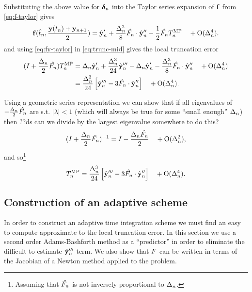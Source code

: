 Substituting the above value for $\mbox{\boldmath$\delta$}_{n}$ into the Taylor series expansion of ${\mathbf{f}}$ from \eqref{eq:f-taylor} gives
\begin{equation}
  {\mathbf{f}}(\hat{t}_{n}, \frac{\mathbf{y}(t_n) + \mathbf{y}_{n+1}}{2}) = \hat{\mathbf{y}}_{n}'
  + \frac{\Delta_{n}^2}{8} \hat{F_{n}} \cdot \hat{\mathbf{y}}_{n}'' - \frac{1}{2} \hat{F_{n}} T_n^{\text{MP}} \quad + \text{O}(\Delta_{n}^4)
  . \label{eq:fy-taylor}
\end{equation}
and using \eqref{eq:fy-taylor} in \eqref{eq:trunc-mid} gives the local truncation error
\begin{align}
  (I + \frac{\Delta_{n}}{2}\hat{F_{n}})T_n^{\text{MP}}
  &= \Delta_{n} \hat{\mathbf{y}}_{n}' + \frac{\Delta_{n}^3}{24} \hat{\mathbf{y}}_{n}'''
  - \Delta_{n} \hat{\mathbf{y}}_{n}'
  - \frac{\Delta_{n}^3}{8} \hat{F_{n}} \cdot \hat{\mathbf{y}}_{n}'' \quad + \text{O}(\Delta_{n}^4)
  \notag \\
  &= \frac{\Delta_{n}^3}{24} \left[\hat{\mathbf{y}}_{n}''' - 3 \hat{F_{n}} \cdot \hat{\mathbf{y}}_{n}'' \right]
  \quad + \text{O}(\Delta_{n}^4).
  \label{eq:trunc-implicit-form}
\end{align}

Using a geometric series representation we can show that if all eigenvalues of  $-\frac{\Delta_{n}}{2}\hat{F_{n}}$ are s.t. $|\lambda| < 1$\cite{??ds} (which will always be true for some ``small enough'' $\Delta_{n}$) then
??ds can we divide by the largest eigenvalue somewhere to do this?
\begin{equation}
  (I + \frac{\Delta_{n}}{2}\hat{F_{n}})^{-1} = I - \frac{\Delta_{n} \hat{F_{n}}}{2}  \quad + \text{O}(\Delta_{n}^2),
\end{equation}
and so\footnote{Assuming that $\hat{F_{n}}$ is not inversely proportional to $\Delta_{n}$.}
\begin{equation}
   T_n^{\text{MP}} = \frac{\Delta_{n}^3}{24} \left[\hat{\mathbf{y}}_{n}''' - 3 \hat{F_{n}} \cdot \hat{\mathbf{y}}_{n}'' \right]
   \quad +\text{O}(\Delta_{n}^4).
  \label{eq:trunc-final}
\end{equation}

\subsection{Construction of an adaptive scheme}

In order to construct an adaptive time integration scheme we must find an easy to compute approximate to the local truncation error.
In this section we use a second order Adams-Bashforth method as a ``predictor'' in order to eliminate the difficult-to-estimate $\hat{\mathbf{y}}_{n}'''$ term.\cite[p.707]{Gresho-Sani}
We also show that $F$ can be written in terms of the Jacobian of a Newton method applied to the problem.

